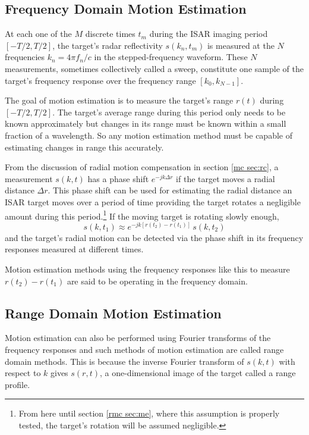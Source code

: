 \subsection{Frequency Domain Motion Estimation}

At each one of the $M$ discrete times $t_m$ during the ISAR imaging period
$[-T/2,T/2]$, the target's radar reflectivity $s(k_n,t_m)$ is measured at
the $N$ frequencies $k_n=4\pi f_n/c$ in the stepped-frequency waveform. 
These $N$ measurements, sometimes collectively called a sweep, constitute
one sample of the target's frequency response over the frequency range
$[k_0,k_{N-1}]$.

The goal of motion estimation is to measure the target's range $r(t)$
during $[-T/2,T/2]$.  The target's average range during this period only
needs to be known approximately but changes in its range must be known
within a small fraction of a wavelength.  So any motion estimation method
must be capable of estimating changes in range this accurately.  

From the discussion of radial motion compensation in section \ref{mc sec:rc}, 
a measurement $s(k,t)$ has a phase shift $e^{-jk\Delta r}$ if the target
moves a radial distance $\Delta r$.  This phase shift can be used for
estimating the radial distance an ISAR target moves over a period of time
providing the target rotates a negligible amount during this
period.\footnote{From here until section \protect\ref{rmc sec:me}, where
this assumption is properly tested, the target's rotation will be assumed 
negligible.}  If the moving target is rotating slowly enough,
\begin{equation}\label{mc eqn:fr change}
s(k,t_1)\approx e^{-jk[r(t_2)-r(t_1)]}\,s(k,t_2)
\end{equation}
and the target's radial motion can be detected via the phase shift in its
frequency responses measured at different times.

Motion estimation methods using the frequency responses like this to measure
$r(t_2)-r(t_1)$ are said to be operating in the frequency domain.  

\subsection{Range Domain Motion Estimation}

Motion estimation can also be performed using Fourier transforms of the
frequency responses and such methods of motion estimation are called
range domain methods.  This is because the inverse Fourier transform of
$s(k,t)$ with respect to $k$ gives $s(r,t)$, a one-dimensional image of the
target called a range profile.  


